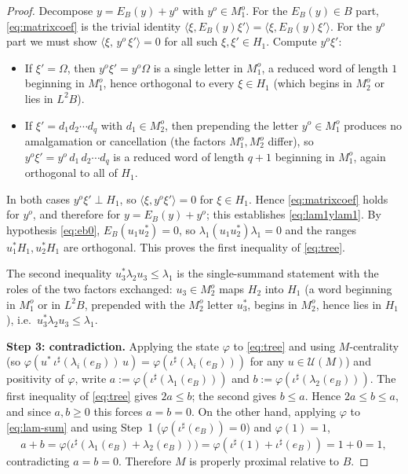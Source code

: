 \documentclass[a4paper, 11pt, reqno]{amsart}
\numberwithin{equation}{section}
\theoremstyle{plain}
\theoremstyle{remark}
\theoremstyle{definition}
\begin{document}
\begin{proof}
Decompose $y=E_B(y)+y^o$ with $y^o\in M_1^o$. For the $E_B(y)\in B$ part, \eqref{eq:matrixcoef} is the trivial identity $\langle\xi,E_B(y)\xi'\rangle=\langle\xi,E_B(y)\xi'\rangle$. For the $y^o$ part we must show $\langle\xi,\,y^o\,\xi'\rangle=0$ for all such $\xi,\xi'\in H_1$. Compute $y^o\xi'$:
\begin{itemize}
\item If $\xi'=\Omega$, then $y^o\xi'=y^o\Omega$ is a single letter in $M_1^o$, a reduced word of length $1$ beginning in $M_1^o$, hence orthogonal to every $\xi\in H_1$ (which begins in $M_2^o$ or lies in $L^2B$).
\item If $\xi'=d_1d_2\cdots d_q$ with $d_1\in M_2^o$, then prepending the letter $y^o\in M_1^o$ produces no amalgamation or cancellation (the factors $M_1^o,M_2^o$ differ), so $y^o\xi'=y^o\,d_1\,d_2\cdots d_q$ is a reduced word of length $q+1$ beginning in $M_1^o$, again orthogonal to all of $H_1$.
\end{itemize}
In both cases $y^o\xi'\perp H_1$, so $\langle\xi,y^o\xi'\rangle=0$ for $\xi\in H_1$. Hence \eqref{eq:matrixcoef} holds for $y^o$, and therefore for $y=E_B(y)+y^o$; this establishes \eqref{eq:lam1ylam1}. By hypothesis \eqref{eq:eb0}, $E_B(u_1u_2^*)=0$, so $\lambda_1(u_1u_2^*)\lambda_1=0$ and the ranges $u_1^*H_1,u_2^*H_1$ are orthogonal. This proves the first inequality of \eqref{eq:tree}.

The second inequality $u_3^*\lambda_2 u_3\le\lambda_1$ is the single-summand statement with the roles of the two factors exchanged: $u_3\in M_2^o$ maps $H_2$ into $H_1$ (a word beginning in $M_1^o$ or in $L^2B$, prepended with the $M_2^o$ letter $u_3^*$, begins in $M_2^o$, hence lies in $H_1$), i.e.\ $u_3^*\lambda_2 u_3\le\lambda_1$.

\medskip\noindent\textbf{Step 3: contradiction.}
Applying the state $\varphi$ to \eqref{eq:tree} and using $M$-centrality (so $\varphi(u^*\,\iota^\sharp(\lambda_i(e_B))\,u)=\varphi(\iota^\sharp(\lambda_i(e_B)))$ for any $u\in\mathcal U(M)$) and positivity of $\varphi$, write $a:=\varphi(\iota^\sharp(\lambda_1(e_B)))$ and $b:=\varphi(\iota^\sharp(\lambda_2(e_B)))$. The first inequality of \eqref{eq:tree} gives $2a\le b$; the second gives $b\le a$. Hence $2a\le b\le a$, and since $a,b\ge0$ this forces $a=b=0$. On the other hand, applying $\varphi$ to \eqref{eq:lam-sum} and using Step~1 ($\varphi(\iota^\sharp(e_B))=0$) and $\varphi(1)=1$,
\[
a+b=\varphi\big(\iota^\sharp(\lambda_1(e_B)+\lambda_2(e_B))\big)=\varphi(\iota^\sharp(1)+\iota^\sharp(e_B))=1+0=1,
\]
contradicting $a=b=0$. Therefore $M$ is properly proximal relative to $B$.
\end{proof}
\end{document}
